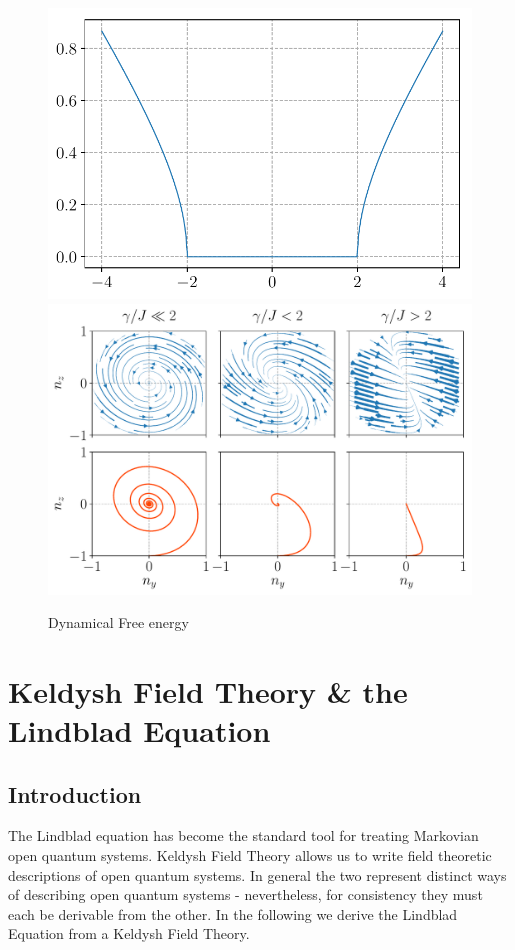 \documentclass{article}
\begin{document}
\begin{figure}[h]
    \includegraphics[width=0.49\linewidth]{bare_transition.pdf}
    \includegraphics[width=0.5\linewidth]{diss.pdf}
    \caption{Dynamical Free energy}\label{fig:dyn}
\end{figure}

%
\section{Keldysh Field Theory \& the Lindblad Equation}\label{sec:open}
%
\subsection{Introduction}
The Lindblad equation has become the standard tool for treating Markovian open quantum systems. 
Keldysh Field Theory allows us to write field theoretic descriptions of open quantum systems. 
In general the two represent distinct ways of describing open quantum systems - nevertheless, for consistency they must each be derivable from the other. 
In the following we derive the Lindblad Equation from a Keldysh Field Theory.
\end{document}
